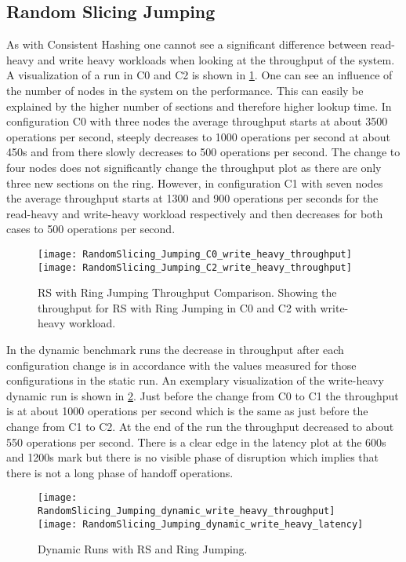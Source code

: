 \subsection{Random Slicing Jumping}
As with Consistent Hashing one cannot see a significant difference between read-heavy and write heavy workloads when looking at the throughput of the system.
A visualization of a run in C0 and C2 is shown in \cref{fig:throughput_random_jumping}.
One can see an influence of the number of nodes in the system on the performance.
This can easily be explained by the higher number of sections and therefore higher lookup time.
In configuration C0 with three nodes the average throughput starts at about 3500 operations per second, steeply decreases to 1000 operations per second at about 450s and from there slowly decreases to 500 operations per second.
The change to four nodes does not significantly change the throughput plot as there are only three new sections on the ring.
However, in configuration C1 with seven nodes the average throughput starts at 1300 and 900 operations per seconds for the read-heavy and write-heavy workload respectively and then decreases for both cases to 500 operations per second.
\begin{figure}
\texttt{[image: RandomSlicing\_Jumping\_C0\_write\_heavy\_throughput]}
\texttt{[image: RandomSlicing\_Jumping\_C2\_write\_heavy\_throughput]}
\caption[\ac{RS} with Ring Jumping Throughput Comparison]{\ac{RS} with Ring Jumping Throughput Comparison. Showing the throughput for \ac{RS} with Ring Jumping in C0 and C2 with write-heavy workload.}
\label{fig:throughput_random_jumping}
\end{figure}

In the dynamic benchmark runs the decrease in throughput after each configuration change is in accordance with the values measured for those configurations in the static run.
An exemplary visualization of the write-heavy dynamic run is shown in \cref{fig:random_slicing_jumping_dynamic}.
Just before the change from C0 to C1 the throughput is at about 1000 operations per second which is the same as just before the change from C1 to C2.
At the end of the run the throughput decreased to about 550 operations per second.
There is a clear edge in the latency plot at the 600s and 1200s mark but there is no visible phase of disruption which implies that there is not a long phase of handoff operations.
\begin{figure}
\texttt{[image: RandomSlicing\_Jumping\_dynamic\_write\_heavy\_throughput]}
\texttt{[image: RandomSlicing\_Jumping\_dynamic\_write\_heavy\_latency]}
\caption[Dynamic Run with \ac{RS} and Ring Jumping]{Dynamic Runs with \ac{RS} and Ring Jumping.}
\label{fig:random_slicing_jumping_dynamic}
\end{figure}

